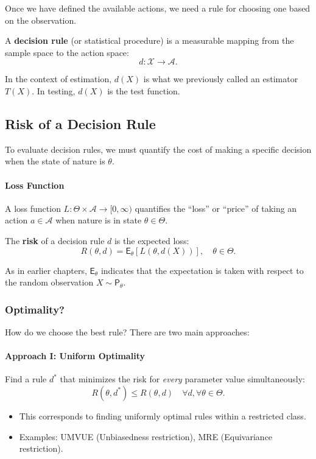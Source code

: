 \medskip

Once we have defined the available actions, we need a rule for choosing one based on the observation.

\begin{definition}
\label{def:decision_rule}
A \textbf{decision rule} (or statistical procedure) is a measurable mapping from the sample space to the action space:
\[
d: \mathcal{X} \to \mathcal{A}.
\]
\end{definition}

In the context of estimation, \(d(X)\) is what we previously called an estimator \(T(X)\). In testing, \(d(X)\) is the test function.

\subsection{Risk of a Decision Rule}
\label{subsec:risk_decision_rule}

To evaluate decision rules, we must quantify the cost of making a specific decision when the state of nature is \(\theta\).

\paragraph{Loss Function}
A loss function \(L: \Theta \times \mathcal{A} \to [0, \infty)\) quantifies the ``loss'' or ``price'' of taking an action \(a \in \mathcal{A}\) when nature is in state \(\theta \in \Theta\).

\begin{definition}
\label{def:risk}
The \textbf{risk} of a decision rule \(d\) is the expected loss:
\[
R(\theta, d) = \mathsf{E}_{\theta} [L(\theta, d(X))], \quad \theta \in \Theta.
\]
\end{definition}
As in earlier chapters, \(\mathsf{E}_{\theta}\) indicates that the expectation is taken with respect to the random observation \(X \sim \mathsf{P}_{\theta}\).

\subsubsection{Optimality?}
\label{subsec:optimality_approaches}

How do we choose the best rule? There are two main approaches:

\paragraph{Approach I: Uniform Optimality}
Find a rule \(d^*\) that minimizes the risk for \textit{every} parameter value simultaneously:
\[
R(\theta, d^*) \le R(\theta, d) \quad \forall d, \forall \theta \in \Theta.
\]
\begin{itemize}
    \item This corresponds to finding uniformly optimal rules within a restricted class.
    \item Examples: UMVUE (Unbiasedness restriction), MRE (Equivariance restriction).
\end{itemize}

